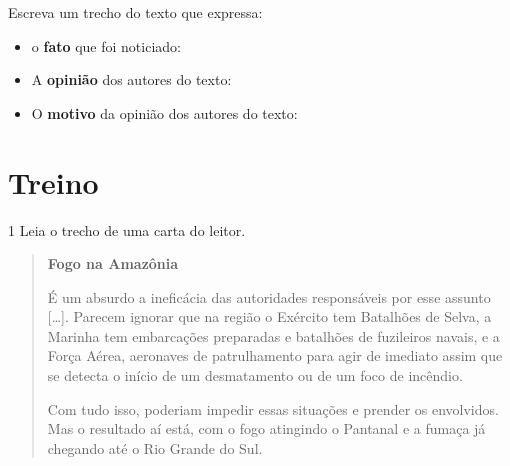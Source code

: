 \begin{conteudo}
\begin{conteudo}
\begin{conteudo}
\begin{conteudo}
\begin{quote}
\end{quote}

\begin{escolha}
\item Escreva um trecho do texto que expressa:


\begin{itemize}
\item o \textbf{fato} que foi noticiado: 

\item A \textbf{opinião} dos autores do texto: 
  
\item O \textbf{motivo} da opinião dos autores do texto: 
\end{itemize}

\end{escolha}

\section{Treino}

\num{1} Leia o trecho de uma carta do leitor.

\begin{quote}
\textbf{Fogo na Amazônia}

É um absurdo a ineficácia das autoridades responsáveis por esse assunto
{[}\ldots{}{]}. Parecem ignorar que na região o Exército tem Batalhões
de Selva, a Marinha tem embarcações preparadas e batalhões de fuzileiros
navais, e a Força Aérea, aeronaves de patrulhamento para agir de
imediato assim que se detecta o início de um desmatamento ou de um foco
de incêndio.

Com tudo isso, poderiam impedir essas situações e prender os envolvidos.
Mas o resultado aí está, com o fogo atingindo o Pantanal e a fumaça já
chegando até o Rio Grande do Sul.


\end{quote}
\end{conteudo}
\end{conteudo}
\end{conteudo}
\end{conteudo}
